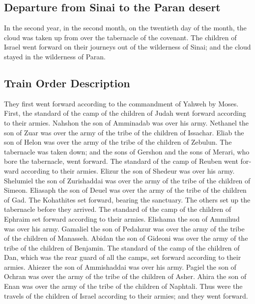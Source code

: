\begin{paracol}{2}
\begin{otherlanguage}{english}
\hypertarget{departure-from-sinai-to-the-paran-desert}{%
\subsection{Departure from Sinai to the Paran
desert}\label{departure-from-sinai-to-the-paran-desert}}

 In the second year, in the second month, on the
twentieth day of the month, the cloud was taken up from over the
tabernacle of the covenant.  The children of Israel went
forward on their journeys out of the wilderness of Sinai; and the cloud
stayed in the wilderness of Paran.

\hypertarget{train-order-description}{%
\subsection{Train Order Description}\label{train-order-description}}

 They first went forward according to the commandment of
Yahweh by Moses.  First, the standard of the camp of the
children of Judah went forward according to their armies. Nahshon the
son of Amminadab was over his army.  Nethanel the son of
Zuar was over the army of the tribe of the children of Issachar.
 Eliab the son of Helon was over the army of the tribe of
the children of Zebulun.  The tabernacle was taken down;
and the sons of Gershon and the sons of Merari, who bore the tabernacle,
went forward.  The standard of the camp of Reuben went
forward according to their armies. Elizur the son of Shedeur was over
his army.  Shelumiel the son of Zurishaddai was over the
army of the tribe of the children of Simeon.  Eliasaph
the son of Deuel was over the army of the tribe of the children of Gad.
 The Kohathites set forward, bearing the sanctuary. The
others set up the tabernacle before they arrived.  The
standard of the camp of the children of Ephraim set forward according to
their armies. Elishama the son of Ammihud was over his army.
 Gamaliel the son of Pedahzur was over the army of the
tribe of the children of Manasseh.  Abidan the son of
Gideoni was over the army of the tribe of the children of Benjamin.
 The standard of the camp of the children of Dan, which
was the rear guard of all the camps, set forward according to their
armies. Ahiezer the son of Ammishaddai was over his army.
 Pagiel the son of Ochran was over the army of the tribe
of the children of Asher.  Ahira the son of Enan was over
the army of the tribe of the children of Naphtali.  Thus
were the travels of the children of Israel according to their armies;
and they went forward.


\end{otherlanguage}
\end{paracol}
